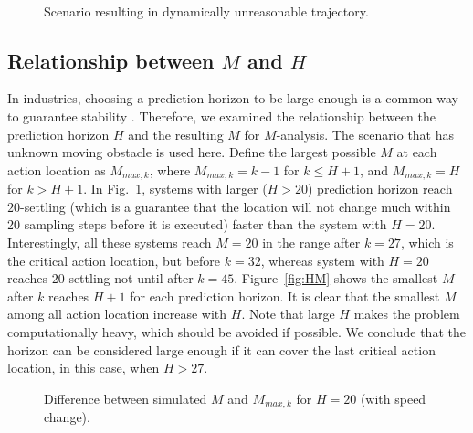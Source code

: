 \documentclass[letterpaper, 10 pt, conference]{ieeeconf}  %
\begin{document}
\begin{figure}[t]
      \centering
      \\
      
      \caption{Scenario resulting in dynamically unreasonable trajectory.}
      
\end{figure}



\subsection{Relationship between $M$ and $H$}

In industries, choosing a prediction horizon to be large enough is a common way to guarantee stability \cite{mayne2000constrained}. Therefore, we examined the relationship between the prediction horizon $H$ and the resulting $M$ for $M$-analysis. The scenario that has unknown moving obstacle is used here. Define the largest possible $M$ at each action location as $M_{max,k}$, where $M_{max,k} = k-1$ for $k\leq H+1$, and $M_{max,k} = H$ for $k>H+1$. In Fig.~\ref{fig:HM20}, systems with larger ($H>20$) prediction horizon reach $20$-settling (which is a guarantee that the location will not change much within 20 sampling steps before it is executed) faster than the system with $H=20$. Interestingly, all these systems reach $M=20$ in the range after $k=27$, which is the critical action location, but before $k=32$, whereas system with $H=20$ reaches $20$-settling not until after $k=45$. Figure~\ref{fig:HM} shows the smallest $M$ after $k$ reaches $H+1$ for each prediction horizon. It is clear that the smallest $M$ among all action location increase with $H$. Note that large $H$ makes the problem computationally heavy, which should be avoided if possible. We conclude that the horizon can be considered large enough if it can cover the last critical action location, in this case, when $H>27$.


 







\begin{figure}[t]
      \centering
       
      \caption{Difference between simulated $M$ and $M_{max,k}$ for $H=20$ (with speed change). }
      \label{fig:HM20}
\end{figure}
\end{document}
